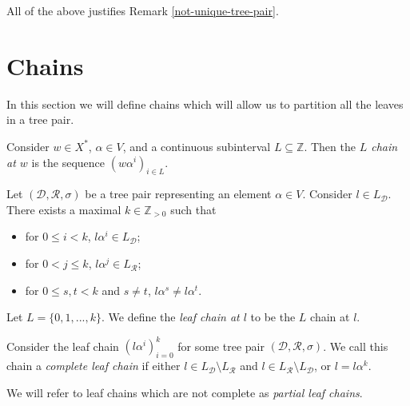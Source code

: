 \documentclass[12pt]{amsart}
\newcommand{\D}{\mathcal{D}}
\newcommand{\R}{\mathcal{R}}
\begin{document}
    
    All of the above justifies Remark \ref{not-unique-tree-pair}.
    
    \section{Chains}
    
        In this section we will define chains which will allow us to partition all the leaves in a tree pair.
        
        \begin{definition}[Chain]
            
            Consider $w \in X^*$, $\alpha \in V$, and a continuous subinterval $L \subseteq \mathbb{Z}$. Then the \textit{$L$ chain at $w$} is the sequence $(w\alpha^i)_{i \in L}$.
        
        \end{definition}
        
        \begin{definition}
            Let $(\D,\R,\sigma)$ be a tree pair representing an element $\alpha \in V$. Consider $l \in L_\D$. There exists a maximal $k \in \mathbb{Z}_{>0}$ such that
            
            \begin{itemize}
                \item for $0 \leq i < k$, $l \alpha^i \in L_\D$;
                \item for $0 < j \leq k$, $l \alpha^j \in L_\R$;
                \item for $0 \leq s,t < k$ and $s \neq t$, $l \alpha^s \neq l \alpha^t$.
            \end{itemize}
            Let $L=\{0,1,...,k\}$. We define the \textit{leaf chain at $l$} to be the $L$ chain at $l$.
        \end{definition}
        
        \begin{definition}
            Consider the leaf chain $(l\alpha^i)_{i=0}^k$ for some tree pair $(\D,\R,\sigma)$. We call this chain a \textit{complete leaf chain} if either $l \in L_\D \setminus L_\R$ and $l \in L_\R \setminus L_\D$, or $l = l \alpha^k$.
        \end{definition}
    
        \begin{remark}
            We will refer to leaf chains which are not complete as \textit{partial leaf chains}.
        \end{remark}
        
\end{document}
